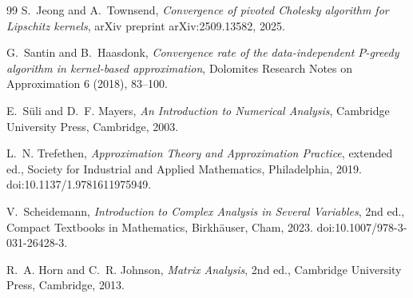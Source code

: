 \documentclass[11pt]{article}
\theoremstyle{definition}
\theoremstyle{remark}
\begin{document}
\begin{thebibliography}{99}
S.~Jeong and A.~Townsend,
\emph{Convergence of pivoted Cholesky algorithm for Lipschitz kernels},
arXiv preprint arXiv:2509.13582, 2025.

G.~Santin and B.~Haasdonk,
\emph{Convergence rate of the data-independent $P$-greedy algorithm in
kernel-based approximation},
Dolomites Research Notes on Approximation 6 (2018), 83--100.

E.~S\"uli and D.~F. Mayers,
\emph{An Introduction to Numerical Analysis},
Cambridge University Press, Cambridge, 2003.

L.~N. Trefethen,
\emph{Approximation Theory and Approximation Practice},
extended ed., Society for Industrial and Applied Mathematics,
Philadelphia, 2019.
doi:10.1137/1.9781611975949.

V.~Scheidemann,
\emph{Introduction to Complex Analysis in Several Variables},
2nd ed.,
Compact Textbooks in Mathematics,
Birkh\"auser, Cham, 2023.
doi:10.1007/978-3-031-26428-3.

R.~A. Horn and C.~R. Johnson,
\emph{Matrix Analysis},
2nd ed., Cambridge University Press, Cambridge, 2013.

\end{thebibliography}
\end{document}
